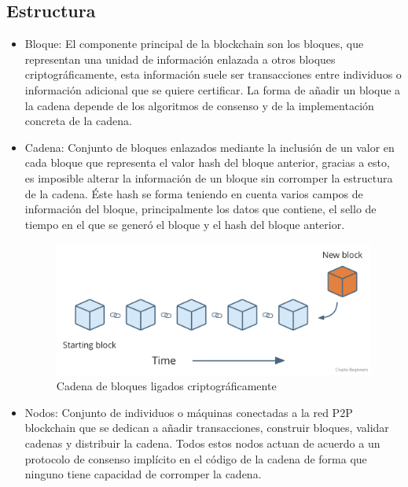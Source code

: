 \documentclass[12pt]{report}
\begin{document}
\subsection{Estructura}

\begin{itemize}


\item

	Bloque: El componente principal de la blockchain son los bloques, que representan una unidad de información enlazada a otros bloques criptográficamente, esta información suele ser transacciones entre individuos o información adicional que se quiere certificar.
	La forma de añadir un bloque a la cadena depende de los algoritmos de consenso y de la implementación concreta de la cadena.
	
\item

	Cadena: Conjunto de bloques enlazados mediante la inclusión de un valor en cada bloque que representa el valor hash del bloque anterior, gracias a esto, es imposible alterar la información de un bloque sin corromper la estructura de la cadena.
	Éste hash se forma teniendo en cuenta varios campos de información del bloque, principalmente los datos que contiene, el sello de tiempo en el que se generó el bloque y el hash del bloque anterior.
\begin{figure}[h]
	\includegraphics[scale=0.4]{new-block}
	\caption{Cadena de bloques ligados criptográficamente}
\end{figure}
\item

	Nodos: Conjunto de individuos o máquinas conectadas a la red P2P blockchain que se dedican a añadir transacciones, construir bloques, validar cadenas y distribuir la cadena.
	Todos estos nodos actuan de acuerdo a un protocolo de consenso implícito en el código de la cadena de forma que ninguno tiene capacidad de corromper la cadena.
\end{itemize}	
\end{document}
